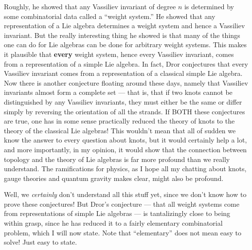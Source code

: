 \documentclass[12pt]{article}
\begin{document}
Roughly, he showed that any Vassiliev invariant of degree \(n\) is
determined by some combinatorial data called a ``weight system.'' He
showed that any representation of a Lie algebra determines a weight
system and hence a Vassiliev invariant. But the really interesting thing
he showed is that many of the things one can do for Lie algebras can be
done for arbitrary weight systems. This makes it plausible that
\textbf{every} weight system, hence every Vassiliev invariant, comes
from a representation of a simple Lie algebra. In fact, Dror conjectures
that every Vassiliev invariant comes from a representation of a
classical simple Lie algebra. Now there is another conjecture floating
around these days, namely that Vassiliev invariants almost form a
complete set --- that is, that if two knots cannot be distinguished by
any Vassiliev invariants, they must either be the same or differ simply
by reversing the orientation of all the strands. If BOTH these
conjectures are true, one has in some sense practically reduced the
theory of knots to the theory of the classical Lie algebras! This
wouldn't mean that all of sudden we know the answer to every question
about knots, but it would certainly help a lot, and more importantly, in
my opinion, it would show that the connection between topology and the
theory of Lie algebras is far more profound than we really understand.
The ramifications for physics, as I hope all my chatting about knots,
gauge theories and quantum gravity makes clear, might also be profound.

Well, we \emph{certainly} don't understand all this stuff yet, since we
don't know how to prove these conjectures! But Dror's conjecture ---
that all weight systems come from representations of simple Lie algebras
--- is tantalizingly close to being within grasp, since he has reduced
it to a fairly elementary combinatorial problem, which I will now state.
Note that ``elementary'' does not mean easy to solve! Just easy to
state.
\end{document}
